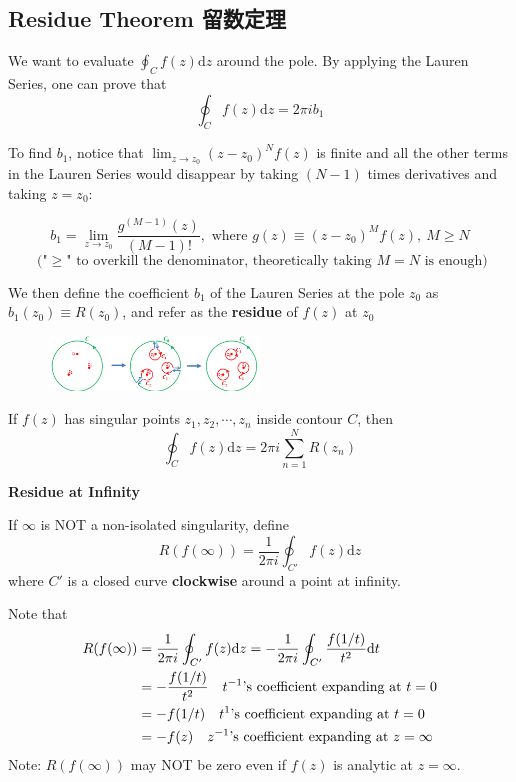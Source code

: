 \documentclass[10pt]{article}
\newcommand{\dd}{\mathrm{d}}
\begin{document}
\subsection{Residue Theorem 留数定理}
We want to evaluate $\oint_C f(z) \dd z$ around the pole. By applying the Lauren Series, one can prove that
$$
\oint_C f(z) \dd z = 2\pi i b_1
$$

\newpage

To find $b_1$, notice that $\lim_{z\to z_0} (z-z_0)^N f(z)$ is finite and all the other terms in the Lauren Series would disappear by taking $(N-1)$ times derivatives and taking $z = z_0$:

$$
b_1 = \lim_{z\to z_0} \frac{g^{(M-1)}(z)}{(M-1)!}, \text{ where } g(z) \equiv (z-z_0)^M f(z),\ M\geq N
$$
$$
\text{ ("$\geq$" to overkill the denominator, theoretically taking $M=N$ is enough)}
$$

We then define the coefficient $b_1$ of the Lauren Series at the pole $z_0$ as $b_1(z_0) \equiv R(z_0)$, and refer as the \textbf{residue} of $f(z)$ at $z_0$

\begin{figure}[h]
	\centering
	\includegraphics[width=0.5\textwidth]{img3-3}
\end{figure}

If $f(z)$ has singular points $z_1, z_2, \cdots, z_n$ inside contour $C$, then
$$
\oint_C f(z)\dd z = 2\pi i \sum_{n=1}^N R(z_n)
$$

\textbf{Residue at Infinity}

If $\infty$ is NOT a non-isolated singularity, define
$$
R(f(\infty)) = \frac{1}{2\pi i} \oint_{C'} f(z) \dd z
$$
where $C'$ is a closed curve \textbf{clockwise} around a point at infinity.

Note that
$$
\begin{aligned}
	R(f(\infty)) &= \frac{1}{2\pi i} \oint_{C'} f(z) \dd z = - \frac{1}{2\pi i} \oint_{C'} \frac{f(1/t)}{t^2} \dd t\\
	&= - \frac{f(1/t)}{t^2} \text{\quad$t^{-1}$'s coefficient expanding at $t=0$}\\
	&= - f(1/t) \text{\quad$t^{1}$'s coefficient expanding at $t=0$}\\
	&= - f(z) \text{\quad$z^{-1}$'s coefficient expanding at $z=\infty$}
\end{aligned}
$$
Note: $R(f(\infty))$ may NOT be zero even if $f(z)$ is analytic at $z=\infty$.
\end{document}
